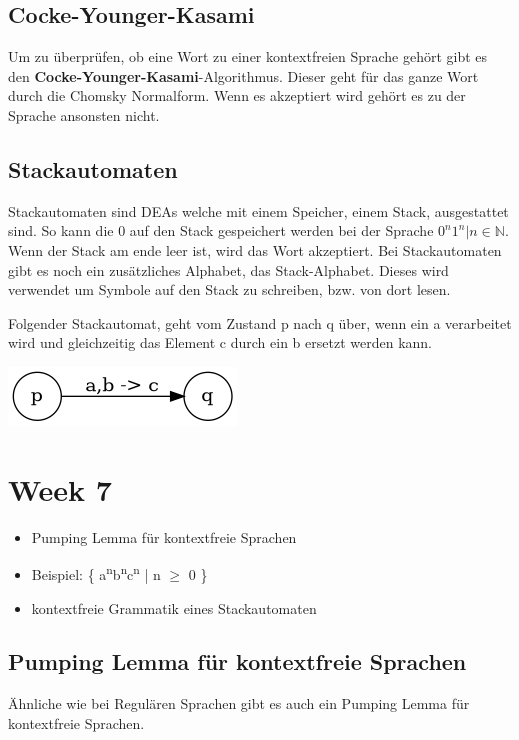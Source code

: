 \documentclass[11pt,twoside,landscape]{article}
\begin{document}
\begin{multicols}{3}
\subsection{Cocke-Younger-Kasami}
\label{sec:org7f22422}
Um zu überprüfen, ob eine Wort zu einer kontextfreien Sprache gehört gibt es den \textbf{Cocke-Younger-Kasami}-Algorithmus. Dieser geht für das ganze Wort durch die Chomsky Normalform. Wenn es akzeptiert wird gehört es zu der Sprache ansonsten nicht.

\subsection{Stackautomaten}
\label{sec:orgc1b1dc1}
Stackautomaten sind DEAs welche mit einem Speicher, einem Stack, ausgestattet sind. So kann die 0 auf den Stack gespeichert werden bei der Sprache \({0^n1^n | n \in \mathbb{N}}\). Wenn der Stack am ende leer ist, wird das Wort akzeptiert. Bei Stackautomaten gibt es noch ein zusätzliches Alphabet, das Stack-Alphabet. Dieses wird verwendet um Symbole auf den Stack zu schreiben, bzw. von dort lesen.

Folgender Stackautomat, geht vom Zustand p nach q über, wenn ein a verarbeitet wird und gleichzeitig das Element c durch ein b ersetzt werden kann.
\begin{center}
\includegraphics[width=.9\linewidth]{img/even_zero_dea.png}
\end{center}

\section{Week 7}
\label{sec:orgfc2e36b}
\begin{itemize}
\item Pumping Lemma für kontextfreie Sprachen
\item Beispiel: \{ a\textsuperscript{n}b\textsuperscript{n}c\textsuperscript{n} | n \(\ge\) 0 \}
\item kontextfreie Grammatik eines Stackautomaten
\end{itemize}

\subsection{Pumping Lemma für kontextfreie Sprachen}
\label{sec:org4ddbb5f}
Ähnliche wie bei Regulären Sprachen gibt es auch ein Pumping Lemma für kontextfreie Sprachen.


\end{multicols}
\end{document}
